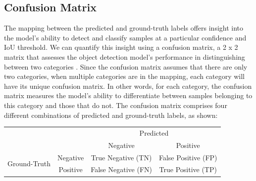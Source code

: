 \subsection{Confusion Matrix}  \label{subsec:confusion_matrix}
The mapping between the predicted and ground-truth labels offers insight into the model's ability to detect and classify samples at a particular confidence and IoU threshold. We can quantify this insight using a confusion matrix, a 2 x 2 matrix that assesses the object detection model's performance in distinguishing between two categories \cite{confusion_matrix_2017}. Since the confusion matrix assumes that there are only two categories, when multiple categories are in the mapping, each category will have its unique confusion matrix. In other words, for each category, the confusion matrix measures the model's ability to differentiate between samples belonging to this category and those that do not. The confusion matrix comprises four different combinations of predicted and ground-truth labels, as shown:
\begin{table}[H]
    \centering
    \begin{tabular}{cc|cc|}
    \cline{3-4}
                                                        &          & \multicolumn{2}{c|}{Predicted}                                 \\ \cline{3-4} 
                                                        &          & \multicolumn{1}{c|}{Negative}            & Positive            \\ \hline
    \multicolumn{1}{|c|}{\multirow{2}{*}{Ground-Truth}} & Negative & \multicolumn{1}{c|}{True Negative (TN)}  & False Positive (FP) \\ \cline{2-4} 
    \multicolumn{1}{|c|}{}                              & Positive & \multicolumn{1}{c|}{False Negative (FN)} & True Positive (TP)  \\ \hline
    \end{tabular}
\end{table}

